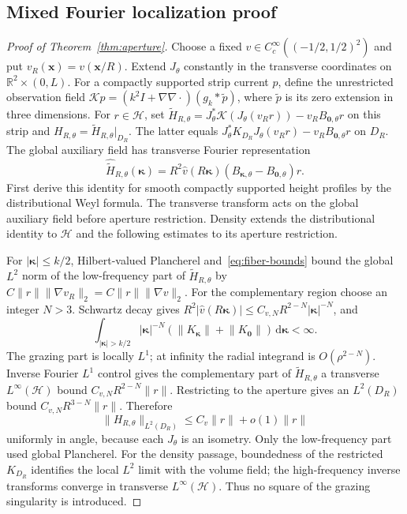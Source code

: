 \documentclass[11pt]{article}
\newcommand{\dd}{\,\mathrm{d}}
\newcommand{\norm}[1]{\lVert #1\rVert}
\newcommand{\abs}[1]{\lvert #1\rvert}
\begin{document}
\subsection{Mixed Fourier localization proof}
\begin{proof}[Proof of Theorem~\ref{thm:aperture}]
Choose a fixed $v\in C_c^\infty((-1/2,1/2)^2)$ and put $v_R(\mathbf x)=v(\mathbf x/R)$. Extend $J_\theta$ constantly in the transverse coordinates on $\mathbb R^2\times(0,L)$. For a compactly supported strip current $p$, define the unrestricted observation field $\mathcal Kp=(k^2I+\nabla\nabla\cdot)(g_k*\widetilde p)$, where $\widetilde p$ is its zero extension in three dimensions. For $r\in\mathcal H$, set $\widetilde H_{R,\theta}=J_\theta^*\mathcal K(J_\theta(v_Rr))-v_RB_{\mathbf0,\theta}r$ on this strip and $H_{R,\theta}=\widetilde H_{R,\theta}|_{D_R}$. The latter equals $J_\theta^*K_{D_R}J_\theta(v_Rr)-v_RB_{\mathbf0,\theta}r$ on $D_R$. The global auxiliary field has transverse Fourier representation
\begin{equation}\label{eq:commutator}
 \widehat{\widetilde H}_{R,\theta}(\boldsymbol\kappa)
 =R^2\widehat v(R\boldsymbol\kappa)(B_{\boldsymbol\kappa,\theta}-B_{\mathbf0,\theta})r.
\end{equation}
First derive this identity for smooth compactly supported height profiles by the distributional Weyl formula. The transverse transform acts on the global auxiliary field before aperture restriction. Density extends the distributional identity to $\mathcal H$ and the following estimates to its aperture restriction.

For $\abs{\boldsymbol\kappa}\leq k/2$, Hilbert-valued Plancherel and~\eqref{eq:fiber-bounds} bound the global $L^2$ norm of the low-frequency part of $\widetilde H_{R,\theta}$ by $C\norm r\norm{\nabla v_R}_2=C\norm r\norm{\nabla v}_2$. For the complementary region choose an integer $N>3$. Schwartz decay gives $R^2\abs{\widehat v(R\boldsymbol\kappa)}\leq C_{v,N}R^{2-N}\abs{\boldsymbol\kappa}^{-N}$, and
\begin{equation}\label{eq:grazing-integral}
 \int_{\abs{\boldsymbol\kappa}>k/2}\abs{\boldsymbol\kappa}^{-N}
 (\norm{K_{\boldsymbol\kappa}}+\norm{K_{\mathbf0}})\dd\boldsymbol\kappa<\infty.
\end{equation}
The grazing part is locally $L^1$; at infinity the radial integrand is $O(\rho^{2-N})$. Inverse Fourier $L^1$ control gives the complementary part of $\widetilde H_{R,\theta}$ a transverse $L^\infty(\mathcal H)$ bound $C_{v,N}R^{2-N}\norm r$. Restricting to the aperture gives an $L^2(D_R)$ bound $C_{v,N}R^{3-N}\norm r$. Therefore
\begin{equation}\label{eq:commutator-bound}
 \norm{H_{R,\theta}}_{L^2(D_R)}\leq C_v\norm r+o(1)\norm r
\end{equation}
uniformly in angle, because each $J_\theta$ is an isometry. Only the low-frequency part used global Plancherel. For the density passage, boundedness of the restricted $K_{D_R}$ identifies the local $L^2$ limit with the volume field; the high-frequency inverse transforms converge in transverse $L^\infty(\mathcal H)$. Thus no square of the grazing singularity is introduced.


\end{proof}
\end{document}
